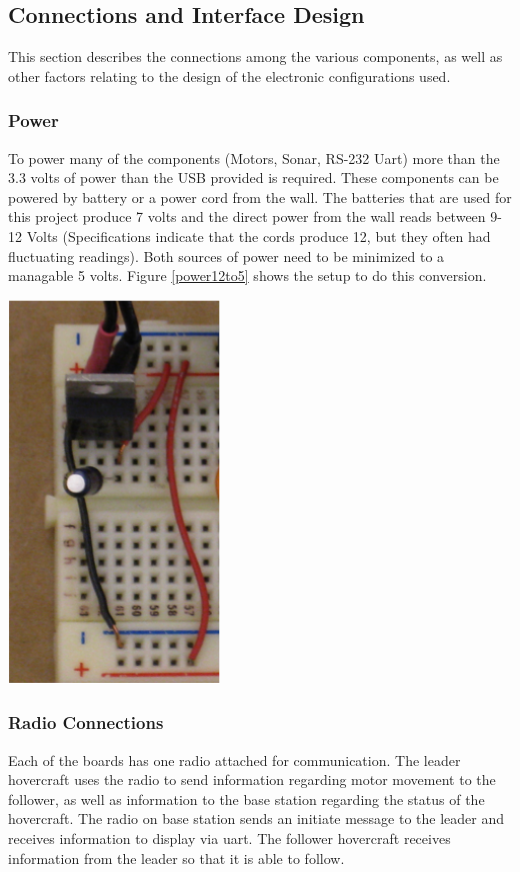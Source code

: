 \subsection{Connections and Interface Design}
This section describes the connections among the various components, as well as other factors relating to the design of the electronic configurations used.  

\subsubsection{Power}
To power many of the components (Motors, Sonar, RS-232 Uart)  more than the 3.3 volts of power than the USB provided is required. These components can be powered by battery or a power cord from the wall. The batteries that are used for this project produce 7 volts and the direct power from the wall reads between 9-12 Volts (Specifications indicate that the cords produce 12, but they often had fluctuating readings).  Both sources of power need to be minimized to a managable 5 volts.  Figure \ref{power12to5} shows the setup to do this conversion.

\begin{minipage}{6.5in}
  \centering
    \includegraphics[height = 4in]{imageSources/power12to5.png}
  
  \label{power12to5}
\end{minipage}

\subsubsection{Radio Connections}
 Each of the boards has one radio attached for communication. The leader hovercraft uses the radio to send information regarding motor movement to the follower, as well as information to the base station regarding the status of the hovercraft.  The radio on base station sends an initiate message to the leader and receives information to display via uart. The follower hovercraft receives information from the leader so that it is able to follow.

